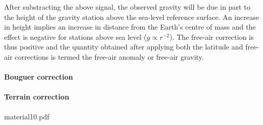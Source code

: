 After substracting the above signal, the observed gravity will
be due in part to the height of the gravity station above the sea-level reference
surface.
An increase in height implies an increase in distance from the Earth's
centre of mass and the effect is negative for stations above sea level ($g \propto r^{-2}$).
The free-air correction is thus positive and 
the quantity obtained after applying both the latitude and
free-air corrections is termed the free-air anomaly or free-air gravity.


\paragraph{Bouguer correction}



\paragraph{Terrain correction}


material10.pdf
